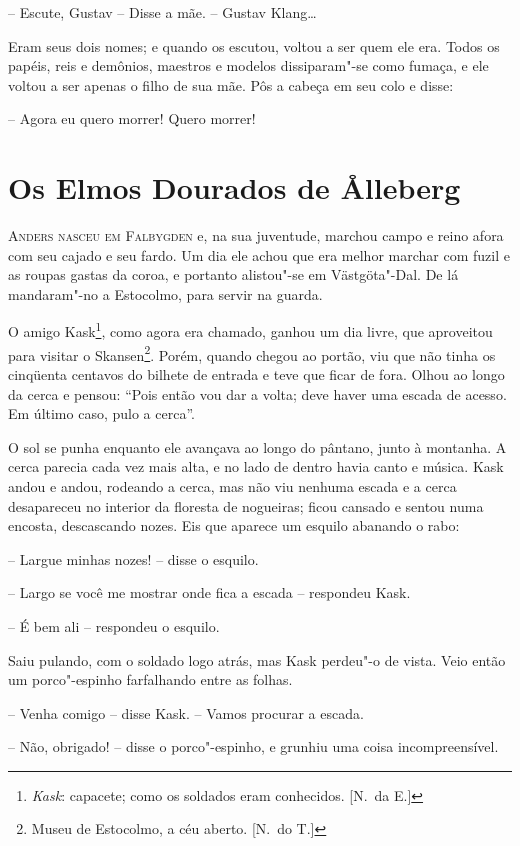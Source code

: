 -- Escute, Gustav -- Disse a mãe. -- Gustav Klang\ldots{}

Eram seus dois nomes; e quando os escutou, voltou a ser quem ele era.
Todos os papéis, reis e demônios, maestros e modelos dissiparam"-se
como fumaça, e ele voltou a ser apenas o filho de sua mãe. Pôs a cabeça
em seu colo e disse:

-- Agora eu quero morrer! Quero morrer!

\chapter[Os Elmos Dourados de \r Alleberg]{Os Elmos Dourados de \r Alleberg} 


\textsc{Anders nasceu em Falbygden} e, na sua juventude, marchou campo e reino
afora com seu cajado e seu fardo. Um dia ele achou que era melhor
marchar com fuzil e as roupas gastas da coroa, e portanto alistou"-se
em Västgöta"-Dal. De lá mandaram"-no a Estocolmo, para servir na guarda.

O amigo Kask\footnote{ \textit{Kask}: capacete; como os soldados eram
conhecidos. [N.~da E.]}, como agora era chamado, ganhou um dia livre, que
aproveitou para visitar o Skansen\footnote{ Museu de Estocolmo, a céu
aberto. [N.~do T.]}. Porém, quando chegou ao portão, viu que não tinha os
cinqüenta centavos do bilhete de entrada e teve que ficar de fora.
Olhou ao longo da cerca e pensou: ``Pois então vou dar a volta; deve
haver uma escada de acesso. Em último caso, pulo a cerca''.

O sol se punha enquanto ele avançava ao longo do pântano, junto à
montanha. A cerca parecia cada vez mais alta, e no lado de dentro havia
canto e música. Kask andou e andou, rodeando a cerca, mas não viu
nenhuma escada e a cerca desapareceu no interior da floresta de
nogueiras; ficou cansado e sentou numa encosta, descascando nozes. Eis
que aparece um esquilo abanando o rabo:

-- Largue minhas nozes! -- disse o esquilo.

-- Largo se você me mostrar onde fica a escada -- respondeu Kask.

-- É bem ali -- respondeu o esquilo.

Saiu pulando, com o soldado logo atrás, mas Kask perdeu"-o de vista.
Veio então um porco"-espinho farfalhando entre as folhas.

-- Venha comigo -- disse Kask. -- Vamos procurar a escada.

-- Não, obrigado! -- disse o porco"-espinho, e grunhiu uma coisa
incompreensível.

